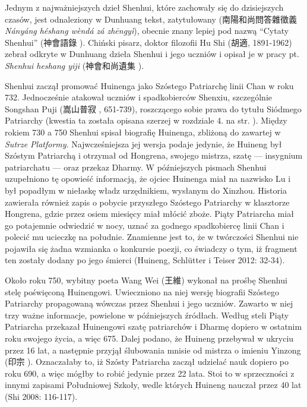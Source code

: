 Jednym z najważniejszych dzieł Shenhui, które zachowały się do dzisiejszych czasów, jest odnaleziony w Dunhuang tekst, zatytułowany  (南陽和尚問答雜徵義 \textit{Nányáng héshang wèndá zá zhēngyì}), obecnie znany lepiej pod nazwą ``Cytaty Shenhui'' (神會語錄 ).
Chiński pisarz, doktor filozofii Hu Shi (胡適, 1891-1962) zebrał odkryte w Dunhuang dzieła Shenhui i jego uczniów i opisał je w pracy pt. \textit{Shenhui heshang yiji} (神會和尚遺集 ).

Shenhui zaczął promować Huinenga jako Szóstego Patriarchę linii Chan w roku 732.
Jednocześnie atakował uczniów i spadkobierców Shenxiu, szczególnie Songshan Puji (嵩山普寂 , 651-739), roszczącego sobie prawa do tytułu Siódmego Patriarchy (kwestia ta została opisana szerzej w rozdziale 4. na str. \pageref{ch:chapter_four}).
Między rokiem 730 a 750 Shenhui spisał biografię Huinenga, zbliżoną do zawartej w \textit{Sutrze Platformy}.
Najwcześniejsza jej wersja podaje jedynie, że Huineng był Szóstym Patriarchą i otrzymał od Hongrena, swojego mistrza, szatę --- insygnium patriarchatu --- oraz przekaz Dharmy.
W późniejszych pismach Shenhui uzupełniono tę opowieść informacją, że ojciec Huinenga miał na nazwisko Lu i był popadłym w niełaskę władz urzędnikiem, wysłanym do Xinzhou.
Historia zawierała również zapis o pobycie przyszłego Szóstego Patriarchy w klasztorze Hongrena, gdzie przez osiem miesięcy miał młócić zboże.
Piąty Patriarcha miał go potajemnie odwiedzić w nocy, uznać za godnego spadkobiercę linii Chan i polecić mu ucieczkę na południe.
Znamienne jest to, że w twórczości Shenhui nie pojawiła się żadna wzmianka o konkursie poezji, co świadczy o tym, iż fragment ten zostały dodany po jego śmierci
(Huineng, Schlütter i Teiser 2012: 32-34).

Około roku 750, wybitny poeta Wang Wei (王維) wykonał na prośbę Shenhui stelę poświęconą Huinengowi.
Uwieczniono na niej wersję biografii Szóstego Patriarchy propagowaną wówczas przez Shenhui i jego uczniów.
Zawarto w niej trzy ważne informacje, powielone w późniejszych źródłach.
Według steli Piąty Patriarcha przekazał Huinengowi szatę patriarchów i Dharmę dopiero w ostatnim roku swojego życia, a więc 675. %
Dalej podano, że Huineng przebywał w ukryciu przez 16 lat, a następnie przyjął ślubowania mnisie od mistrza o imieniu Yinzong (印宗 ).
Oznaczałaby to, iż Szósty Patriarcha zaczął udzielać nauk dopiero po roku 690, a więc mógłby to robić jedynie przez 22 lata.
Stoi to w sprzeczności z innymi zapisami Południowej Szkoły, wedle których Huineng nauczał przez 40 lat
(Shi 2008: 116-117).

